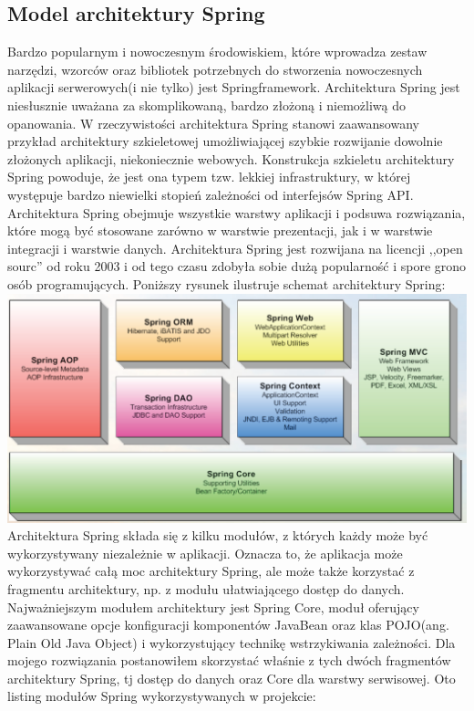 \subsection{Model architektury Spring}
\label{sec:modelArchitekturySpring}
Bardzo popularnym i nowoczesnym środowiskiem, które wprowadza zestaw narzędzi, wzorców oraz bibliotek potrzebnych do stworzenia nowoczesnych aplikacji serwerowych(i nie tylko) jest Springframework. Architektura Spring jest niesłusznie uważana za skomplikowaną, bardzo złożoną i niemożliwą do opanowania. W rzeczywistości architektura Spring stanowi zaawansowany przykład architektury szkieletowej umożliwiającej szybkie rozwijanie dowolnie złożonych aplikacji, niekoniecznie webowych. Konstrukcja szkieletu architektury Spring powoduje, że jest ona typem tzw. lekkiej infrastruktury, w której występuje bardzo niewielki stopień zależności od interfejsów Spring API. Architektura Spring obejmuje wszystkie warstwy aplikacji i podsuwa rozwiązania, które mogą być stosowane zarówno w warstwie prezentacji, jak i w warstwie integracji i warstwie danych. Architektura Spring jest rozwijana na licencji ,,open sourc'' od roku 2003 i od tego czasu zdobyła sobie dużą popularność i spore grono osób programujących. Poniższy rysunek ilustruje schemat architektury Spring:
\includegraphics[scale=0.31]{images/spring-modules}
Architektura Spring składa się z kilku modułów, z których każdy może być wykorzystywany niezależnie w aplikacji. Oznacza to, że aplikacja może wykorzystywać całą moc architektury Spring, ale może także korzystać z fragmentu architektury, np. z modułu ułatwiającego dostęp do danych. Najważniejszym modułem architektury jest Spring Core, moduł oferujący zaawansowane opcje konfiguracji komponentów JavaBean oraz klas POJO(ang. Plain Old Java Object) i wykorzystujący technikę wstrzykiwania zależności.
Dla mojego rozwiązania postanowiłem skorzystać właśnie z tych dwóch fragmentów architektury Spring, tj dostęp do danych oraz Core dla warstwy serwisowej. Oto listing modułów Spring wykorzystywanych w projekcie:
